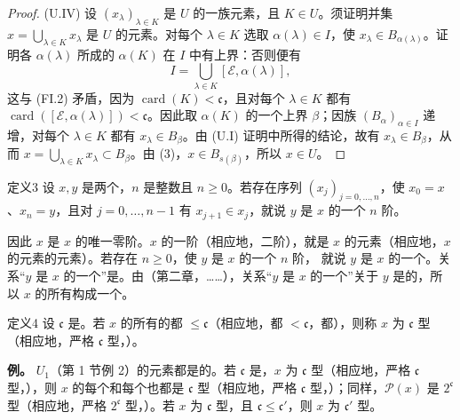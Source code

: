 \begin{proof}
(U.IV) 设 $(x_\lambda)_{\lambda\in K}$ 是 $U$ 的一族元素，且 $K\in U$。须证明并集 $x=\bigcup_{\lambda\in K}x_\lambda$ 是 $U$ 的元素。对每个 $\lambda\in K$ 选取 $\alpha(\lambda)\in I$，使 $x_\lambda\in B_{\alpha(\lambda)}$。证明各 $\alpha(\lambda)$ 所成的 $\alpha(K)$ 在 $I$ 中有上界：否则便有
\[
 I=\bigcup_{\lambda\in K}[\mathscr E,\alpha(\lambda)],
\]
这与 (FI.2) 矛盾，因为 $\operatorname{card}(K)<\mathfrak{c}$，且对每个 $\lambda\in K$ 都有 $\operatorname{card}([\mathscr E,\alpha(\lambda)])<\mathfrak{c}$。因此取 $\alpha(K)$ 的一个上界 $\beta$；因族 $(B_\alpha)_{\alpha\in I}$ 递增，对每个 $\lambda\in K$ 都有 $x_\lambda\in B_\beta$。由 (U.I) 证明中所得的结论，故有 $x_\lambda\in B_\beta$，从而 $x=\bigcup_{\lambda\in K}x_\lambda\subset B_\beta$。由 (3)，$x\in B_{s(\beta)}$，所以 $x\in U$。
\end{proof}

\begin{SGAresult}{定义}{3}
设 $x,y$ 是两个，$n$ 是整数且 $n\geq0$。若存在序列 $(x_j)_{j=0,\ldots,n}$，使 $x_0=x$、$x_n=y$，且对 $j=0,\ldots,n-1$ 有 $x_{j+1}\in x_j$，就说 $y$ 是 $x$ 的一个 $n$ 阶。
\end{SGAresult}
因此 $x$ 是 $x$ 的唯一零阶。$x$ 的一阶（相应地，二阶），就是 $x$ 的元素（相应地，$x$ 的元素的元素）。若存在 $n\geq0$，使 $y$ 是 $x$ 的一个 $n$ 阶，
就说 $y$ 是 $x$ 的一个。关系“$y$ 是 $x$ 的一个”是。由（第二章，……），关系“$y$ 是 $x$ 的一个”关于 $y$ 是的，所以 $x$ 的所有构成一个。

\begin{SGAresult}{定义}{4}
设 $\mathfrak{c}$ 是。若 $x$ 的所有的都 $\leq\mathfrak{c}$（相应地，都 $<\mathfrak{c}$，都），则称 $x$ 为 $\mathfrak{c}$ 型（相应地，严格 $\mathfrak{c}$ 型，）。
\end{SGAresult}
\textbf{例。} $U_1$（第 1 节例 2）的元素都是的。若 $\mathfrak{c}$ 是，$x$ 为 $\mathfrak{c}$ 型（相应地，严格 $\mathfrak{c}$ 型，），则 $x$ 的每个和每个也都是 $\mathfrak{c}$ 型（相应地，严格 $\mathfrak{c}$ 型，）；同样，$\mathcal P(x)$ 是 $2^{\mathfrak{c}}$ 型（相应地，严格 $2^{\mathfrak{c}}$ 型，）。若 $x$ 为 $\mathfrak{c}$ 型，且 $\mathfrak{c}\leq\mathfrak{c}'$，则 $x$ 为 $\mathfrak{c}'$ 型。


